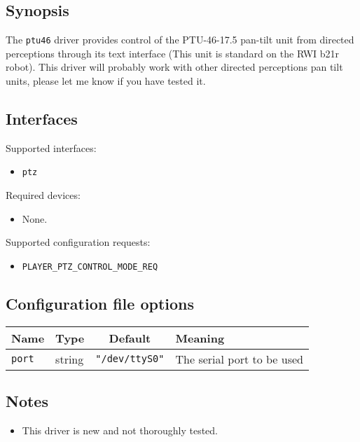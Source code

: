 \subsection*{Synopsis}
The {\tt ptu46} driver provides control of the PTU-46-17.5
pan-tilt unit from directed perceptions through its text interface
(This unit is standard on the RWI b21r robot). This driver will
probably work with other directed perceptions pan tilt units,
please let me know if you have tested it.

\subsection*{Interfaces}

\noindent Supported interfaces:
\begin{itemize}
\item {\tt ptz}
\end{itemize}

\noindent Required devices:
\begin{itemize}
\item None.
\end{itemize}

\noindent Supported configuration requests:
\begin{itemize}
\item {\tt PLAYER\_PTZ\_CONTROL\_MODE\_REQ}
\end{itemize}

\subsection*{Configuration file options}

\begin{center}
{\small \begin{tabularx}{\columnwidth}{|l|l|c|X|}
\hline
Name & Type & Default & Meaning\\
\hline
{\tt port} & string & {\tt "/dev/ttyS0"} & The serial port to be used\\
\hline
\end{tabularx}}
\end{center}

\subsection*{Notes}
\begin{itemize}
\item This driver is new and not thoroughly tested.
\end{itemize}
